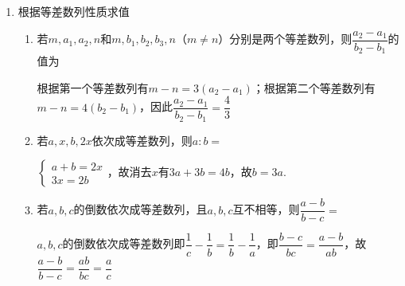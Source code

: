 \begin{enumerate}
\begin{enumerate}
\begin{jieda}
            由韦达定理有$\left \{ \begin{array}{l}
                 a_1 + a_2 = a_3  \\
                 a_1 \cdot a_2 = a_4 
            \end{array} \right.$，根据第一个式子有$a_1 = d$，代入第二个式子有$a_1 = d = 2$，故$a_n = 2n$.
        \end{jieda}
        \item 若等差数列$\{a_n\}$中$a_2 + a_3 + a_4 + a_5 = 34$，$a_2 a_5 = 52$，且$a_4 > a_2$，则$a_3 = $
        \begin{jieda}
            $a_2 + a_3 + a_4 + a_5 = 2(a_2 + a_5)$，因此有$\left \{\begin{array}{l}
                 a_2 + a_5 = 17  \\
                 a_2 \cdot a_5 = 52
            \end{array} \right.$，结合$a_4 > a_2$可知等差数列$\{a_n\}$为严格增数列，故$a_2 = 4, a_5 = 13$，故公差为$3$，通项公式为$3n-2$，故$a_3 = 7$.
        \end{jieda}
    \end{enumerate}
    \item 根据等差数列性质求值
    \begin{enumerate}
        \item 若$m, a_1, a_2, n$和$m, b_1, b_2, b_3, n$（$m \neq n$）分别是两个等差数列，则$\dfrac{a_2 - a_1}{b_2 - b_1}$的值为
        \begin{jieda}
            根据第一个等差数列有$m-n = 3(a_2 - a_1)$；根据第二个等差数列有$m-n = 4(b_2 - b_1)$，因此$\dfrac{a_2 - a_1}{b_2 - b_1} = \dfrac{4}{3}$
        \end{jieda}
        \item 若$a, x, b, 2x$依次成等差数列，则$a:b = $
        \begin{jieda}
            $\left \{ \begin{array}{l}
                 a+b = 2x  \\
                 3x = 2b
            \end{array} \right.$，故消去$x$有$3a+3b = 4b$，故$b = 3a$.
        \end{jieda}
        \item 若$a, b, c$的倒数依次成等差数列，且$a, b, c$互不相等，则$\dfrac{a-b}{b-c} = $
        \begin{jieda}
            $a, b, c$的倒数依次成等差数列即$\dfrac{1}{c} - \dfrac{1}{b} = \dfrac{1}{b} - \dfrac{1}{a}$，即$\dfrac{b-c}{bc} = \dfrac{a - b}{ab}$，故$\dfrac{a-b}{b-c} = \dfrac{ab}{bc} = \dfrac{a}{c}$

\end{jieda}
\end{enumerate}
\end{enumerate}
